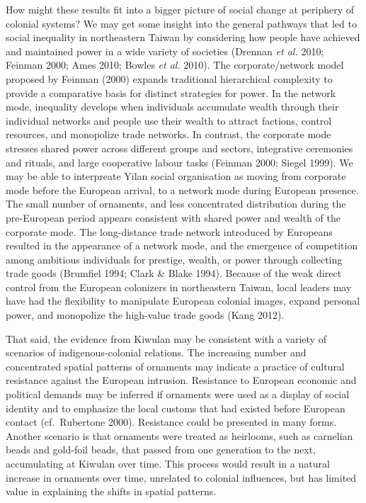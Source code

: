 \documentclass[]{article}
\begin{document}
How might these results fit into a bigger picture of social change at
periphery of colonial systems? We may get some insight into the general
pathways that led to social inequality in northeastern Taiwan by
considering how people have achieved and maintained power in a wide
variety of societies (Drennan \emph{et al.} 2010; Feinman 2000; Ames
2010; Bowles \emph{et al.} 2010). The corporate/network model proposed
by Feinman (2000) expands traditional hierarchical complexity to provide
a comparative basis for distinct strategies for power. In the network
mode, inequality develops when individuals accumulate wealth through
their individual networks and people use their wealth to attract
factions, control resources, and monopolize trade networks. In contrast,
the corporate mode stresses shared power across different groups and
sectors, integrative ceremonies and rituals, and large cooperative
labour tasks (Feinman 2000; Siegel 1999). We may be able to interpreate
Yilan social organisation as moving from corporate mode before the
European arrival, to a network mode during European presence. The small
number of ornaments, and less concentrated distribution during the
pre-European period appears consistent with shared power and wealth of
the corporate mode. The long-distance trade network introduced by
Europeans resulted in the appearance of a network mode, and the
emergence of competition among ambitious individuals for prestige,
wealth, or power through collecting trade goods (Brumfiel 1994; Clark \&
Blake 1994). Because of the weak direct control from the European
colonizers in northeastern Taiwan, local leaders may have had the
flexibility to manipulate European colonial images, expand personal
power, and monopolize the high-value trade goods (Kang 2012).

That said, the evidence from Kiwulan may be consistent with a variety of
scenarios of indigenous-colonial relations. The increasing number and
concentrated spatial patterns of ornaments may indicate a practice of
cultural resistance against the European intrusion. Resistance to
European economic and political demands may be inferred if ornaments
were used as a display of social identity and to emphasize the local
customs that had existed before European contact (cf.~Rubertone 2000).
Resistance could be presented in many forms. Another scenario is that
ornaments were treated as heirlooms, such as carnelian beads and
gold-foil beads, that passed from one generation to the next,
accumulating at Kiwulan over time. This process would result in a
natural increase in ornaments over time, unrelated to colonial
influences, but has limited value in explaining the shifts in spatial
patterns.
\end{document}
